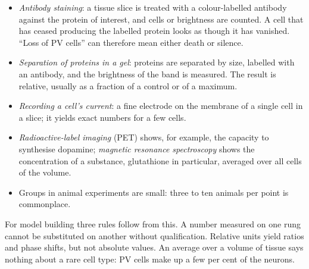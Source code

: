 \begin{itemize}
\item \emph{Antibody staining}: a tissue slice is treated with a colour-labelled antibody against the protein of interest, and cells or brightness are counted. A cell that has ceased producing the labelled protein looks as though it has vanished. ``Loss of PV cells'' can therefore mean either death or silence.\tU
\item \emph{Separation of proteins in a gel}: proteins are separated by size, labelled with an antibody, and the brightness of the band is measured. The result is relative, usually as a fraction of a control or of a maximum.\tU
\item \emph{Recording a cell's current}: a fine electrode on the membrane of a single cell in a slice; it yields exact numbers for a few cells.\tU
\item \emph{Radioactive-label imaging} (PET) shows, for example, the capacity to synthesise dopamine; \emph{magnetic resonance spectroscopy} shows the concentration of a substance, glutathione in particular, averaged over all cells of the volume.\tU
\item Groups in animal experiments are small: three to ten animals per point is commonplace.\tU
\end{itemize}
\begin{ineq}
For model building three rules follow from this. A number measured on one rung cannot be substituted on another without qualification. Relative units yield ratios and phase shifts, but not absolute values. An average over a volume of tissue says nothing about a rare cell type: PV cells make up a few per cent of the neurons.
\end{ineq}
